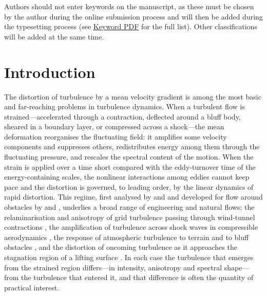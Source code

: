 \documentclass[lineno]{JFM-FLM_Au}
\begin{document}
\begin{keywords}
Authors should not enter keywords on the manuscript, as these must be chosen by the author during the online submission process and will then be added during the typesetting process (see \href{https://www.cambridge.org/core/services/aop-file-manager/file/61436b61ff7f3cfab749ce3a/JFM-Keywords-Sept-2021.pdf.}{Keyword PDF} for the full list).  Other classifications will be added at the same time.
\end{keywords}

\section{Introduction}\label{sec:intro}

The distortion of turbulence by a mean velocity gradient is among the most
basic and far-reaching problems in turbulence dynamics. When a turbulent flow
is strained---accelerated through a contraction, deflected around a bluff body,
sheared in a boundary layer, or compressed across a shock---the mean
deformation reorganises the fluctuating field: it amplifies some velocity
components and suppresses others, redistributes energy among them through the
fluctuating pressure, and rescales the spectral content of the motion. When the
strain is applied over a time short compared with the eddy-turnover time of the
energy-containing scales, the nonlinear interactions among eddies cannot keep
pace and the distortion is governed, to leading order, by the linear dynamics
of rapid distortion. This regime, first analysed by
\citet{BatchelorProudman1954} and \citet{TownsendBook} and developed for flow
around obstacles by \citet{Hunt1973} and \citet{Goldstein1978}, underlies a
broad range of engineering and natural flows: the relaminarisation and
anisotropy of grid turbulence passing through wind-tunnel contractions
\citep{MillsCorrsin1959,TuckerReynolds1968,LeeReynolds1985}, the amplification
of turbulence across shock waves in compressible aerodynamics
\citep{Ribner1953}, the response of atmospheric turbulence to
terrain and to bluff obstacles \citep{HuntCarruthers1990,Britter1981}, and the
distortion of oncoming turbulence as it approaches the stagnation region of a
lifting surface \citep{HuntGraham1978,GoldsteinAtassi1976}. In each case the
turbulence that emerges from the strained region differs---in intensity,
anisotropy and spectral shape---from the turbulence that entered it, and that
difference is often the quantity of practical interest.
\end{document}
